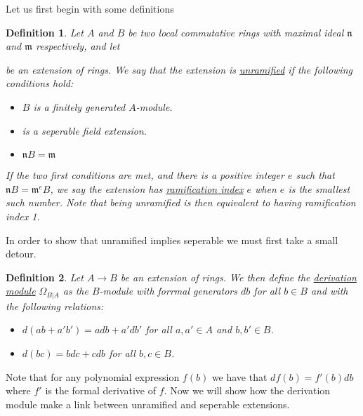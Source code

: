 \documentclass[11pt, a4paper, english]{article}
\numberwithin{prop}{section}
\numberwithin{lemma}{section}
\numberwithin{theorem}{section}
\newtheorem{defin}{Definition}
\numberwithin{defin}{section}
\numberwithin{example}{section}
\begin{document}
Let us first begin with some definitions
\begin{defin}
Let $A$ and $B$ be two local commutative rings with maximal ideal $\mathfrak{n}$ and $\mathfrak{m}$ respectively, and let 
be an extension of rings. We say that the extension is \underline{unramified} if the following conditions hold:
\begin{itemize}
\item $B$ is a finitely generated $A$-module.
\item {}
is a seperable field extension.
\item $\mathfrak{n}B = \mathfrak{m}$
\end{itemize}
If the two first conditions are met, and there is a positive integer $e$ such that $\mathfrak{n} B = \mathfrak{m}^e B$, we say the extension has \underline{ramification index} $e$ when $e$ is the smallest such number. Note that being unramified is then equivalent to having ramification index 1. 
\end{defin}

In order to show that unramified implies seperable we must first take a small detour.

\begin{defin}
Let $A \to B$ be an extension of rings. We then define the \underline{derivation module} $\Omega_{B | A}$ as the $B$-module with forrmal generators $db$ for all $b \in B$ and with the following relations:
\begin{itemize}
\item[$A$-linearity:] $d(ab + a'b') = adb + a'db'$ for all $a, a' \in A$ and $b, b' \in B$.
\item[Leibniz rule:] $d(bc) = bdc + cdb$ for all $b,c \in B$.
\end{itemize} 
\end{defin}
Note that for any polynomial expression $f(b)$ we have that $df(b) = f'(b)db$ where $f'$ is the formal derivative of $f$. Now we will show how the derivation module make a link between unramified and seperable extensions.
\end{document}
